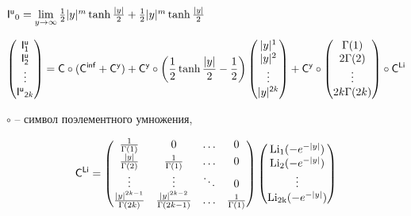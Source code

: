 \documentclass[a4paper,12pt]{article}
\begin{document}
\begin{center}
    $\mathsf{I^u}_0 = \lim\limits_{y\rightarrow \infty} {1\over{2}}|y|^m \operatorname{tanh}{|y|\over{2}} + {1\over{2}}|y|^m \operatorname{tanh}{|y|\over{2}}$
\end{center}

\begin{displaymath}
    \begin{pmatrix}
        \mathsf{I^u_1} \\ \mathsf{I^u_2} \\ \vdots \\ \mathsf{I^u}_{\mathsf{2}k} \\
    \end{pmatrix} = \mathsf{C} \circ (\mathsf{C^{inf}} + \mathsf{C^y}) + \mathsf{C^y} \circ \left({1\over{2}}\operatorname{tanh}{|y|\over{2}} - {1\over{2}}\right) \begin{pmatrix}
        |y|^1 \\ |y|^2 \\ \vdots \\ |y|^{\mathsf{2}k} \\
    \end{pmatrix} + \mathsf{C^y} \circ \begin{pmatrix}
        \Gamma(1) \\ 2\Gamma(2) \\ \vdots \\ 2k\Gamma(2k) \\
    \end{pmatrix} \circ \mathsf{C^{Li}} 
\end{displaymath}

 $\circ$ – символ поэлементного умножения,

\begin{displaymath}
    \mathsf{C^{Li}} =
    \begin{pmatrix}
        1\over{\Gamma(1)} & 0 & \ldots & 0 \\
        |y|\over{\Gamma(2)} & 1\over{\Gamma(1)} & \ldots & 0 \\
        \vdots & \vdots & \ddots & 0 \\
        |y|^{2k - 1}\over{\Gamma(2k)} & |y|^{2k - 2}\over{\Gamma(2k - 1)} & \ldots & 1\over{\Gamma(1)} \\
    \end{pmatrix} \begin{pmatrix}
        \operatorname{Li_1}(-e^{-|y|}) \\ \operatorname{Li_2}(-e^{-|y|}) \\ \vdots \\ \operatorname{Li_{2k}}(-e^{-|y|}) \\
    \end{pmatrix} 
\end{displaymath}
\end{document}
